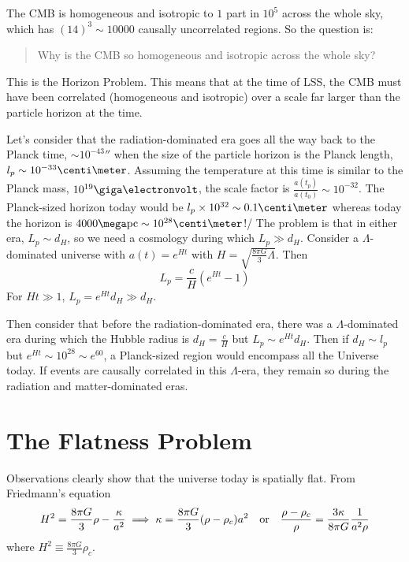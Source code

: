 \documentclass[a4paper,twoside,master.tex]{subfiles}
\begin{document}
The CMB is homogeneous and isotropic to $ 1 $ part in $ 10^5 $ across the whole sky, which has $ (14)^3 \sim 10000 $ causally uncorrelated regions. So the question is:

\begin{quote}
    Why is the CMB so homogeneous and isotropic across the whole sky?
\end{quote}
This is the Horizon Problem. This means that at the time of LSS, the CMB must have been correlated (homogeneous and isotropic) over a scale far larger than the particle horizon at the time.

Let's consider that the radiation-dominated era goes all the way back to the Planck time, $ \sim 10^{-43} \second $ when the size of the particle horizon is the Planck length, $ l_p \sim 10^{-33} \centi\meter $. Assuming the temperature at this time is similar to the Planck mass, $ 10^{19} \giga\electronvolt $, the scale factor is $ \frac{a(t_p)}{a(t_0)} \sim 10^{-32} $. The Planck-sized horizon today would be $ l_p \times 10^{32} \sim 0.1\centi\meter $ whereas today the horizon is $ 4000\mega \text{pc} \sim 10^{28} \centi\meter $!/ The problem is that in either era, $ L_p \sim d_H $, so we need a cosmology during which $ L_p \gg d_H $. Consider a $ \Lambda $-dominated universe with $ a(t) = e^{Ht} $ with $ H = \sqrt{\frac{8 \pi G}{3} \Lambda} $. Then
\begin{equation}
    L_p = \frac{c}{H} (e^{Ht} - 1)
\end{equation}
For $ Ht\gg 1 $, $ L_p = e^{Ht} d_H \gg d_H $.

Then consider that before the radiation-dominated era, there was a $ \Lambda $-dominated era during which the Hubble radius is $ d_H = \frac{c}{H} $ but $ L_p \sim e^{Ht} d_H $. Then if $ d_H \sim l_p $ but $ e^{Ht} \sim 10^{28} \sim e^{60} $, a Planck-sized region would encompass all the Universe today. If events are causally correlated in this $ \Lambda $-era, they remain so during the radiation and matter-dominated eras.

\section{The Flatness Problem}\label{sec:the_flatness_problem}

Observations clearly show that the universe today is spatially flat. From Friedmann's equation
\begin{equation}
    H^2 = \frac{8 \pi G}{3} \rho - \frac{\kappa}{a^2} \implies \kappa = \frac{8 \pi G}{3} (\rho - \rho_c) a^2 \qor \frac{\rho - \rho_c}{\rho} = \frac{3 \kappa}{8 \pi G} \frac{1}{a^2 \rho}
\end{equation}
where $ H^2 \equiv \frac{8 \pi G}{3} \rho_c $.
\end{document}

